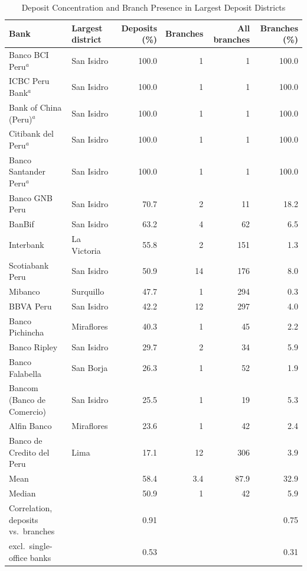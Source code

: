 \begin{table}[!h]
\centering
\caption{\label{tab:kundu_deposit_concentration}Deposit Concentration and Branch Presence in Largest Deposit Districts}
\centering
\fontsize{9}{11}\selectfont
\begin{threeparttable}
\begin{tabular}[t]{llrrrr}
\toprule
Bank & Largest district & Deposits (\%) & Branches & All branches & Branches (\%)\\
\midrule
Banco BCI Peru$^{a}$ & San Isidro & 100.0 & 1 & 1 & 100.0\\
ICBC Peru Bank$^{a}$ & San Isidro & 100.0 & 1 & 1 & 100.0\\
Bank of China (Peru)$^{a}$ & San Isidro & 100.0 & 1 & 1 & 100.0\\
Citibank del Peru$^{a}$ & San Isidro & 100.0 & 1 & 1 & 100.0\\
Banco Santander Peru$^{a}$ & San Isidro & 100.0 & 1 & 1 & 100.0\\
Banco GNB Peru & San Isidro & 70.7 & 2 & 11 & 18.2\\
BanBif & San Isidro & 63.2 & 4 & 62 & 6.5\\
Interbank & La Victoria & 55.8 & 2 & 151 & 1.3\\
Scotiabank Peru & San Isidro & 50.9 & 14 & 176 & 8.0\\
Mibanco & Surquillo & 47.7 & 1 & 294 & 0.3\\
BBVA Peru & San Isidro & 42.2 & 12 & 297 & 4.0\\
Banco Pichincha & Miraflores & 40.3 & 1 & 45 & 2.2\\
Banco Ripley & San Isidro & 29.7 & 2 & 34 & 5.9\\
Banco Falabella & San Borja & 26.3 & 1 & 52 & 1.9\\
Bancom (Banco de Comercio) & San Isidro & 25.5 & 1 & 19 & 5.3\\
Alfin Banco & Miraflores & 23.6 & 1 & 42 & 2.4\\
Banco de Credito del Peru & Lima & 17.1 & 12 & 306 & 3.9\\
\midrule
Mean &  & 58.4 & 3.4 & 87.9 & 32.9\\
Median &  & 50.9 & 1 & 42 & 5.9\\
Correlation, deposits vs.\ branches &  & 0.91 &  &  & 0.75\\
\quad excl.\ single-office banks &  & 0.53 &  &  & 0.31\\
\bottomrule
\end{tabular}
\begin{tablenotes}

\end{tablenotes}
\end{threeparttable}
\end{table}
